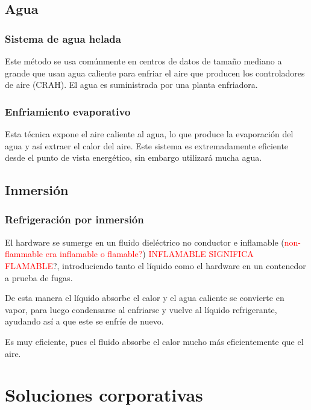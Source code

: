 \subsection{Agua}

\subsubsection{Sistema de agua helada}

Este método se usa comúnmente en centros de datos de tamaño mediano a grande que usan agua caliente para enfriar el aire que producen los controladores de aire (CRAH). El agua es suministrada por una planta enfriadora.

\subsubsection{Enfriamiento evaporativo}

Esta técnica expone el aire caliente al agua, lo que produce la evaporación del agua y así extraer el calor del aire. Este sistema es extremadamente eficiente desde el punto de vista energético, sin embargo utilizará mucha agua.

\subsection{Inmersión}

\subsubsection{Refrigeración por inmersión}

El hardware se sumerge en un fluido dieléctrico no conductor e inflamable (\textcolor{red}{non-flammable era inflamable o flamable?}) \textcolor{red}{INFLAMABLE SIGNIFICA FLAMABLE}?, introduciendo tanto el líquido como el hardware en un contenedor a prueba de fugas.

De esta manera el líquido absorbe el calor y el agua caliente se convierte en vapor, para luego condensarse al enfriarse y vuelve al líquido refrigerante, ayudando así a que este se enfríe de nuevo.

Es muy eficiente, pues el fluido absorbe el calor mucho más eficientemente que el aire.

\section{Soluciones corporativas}

